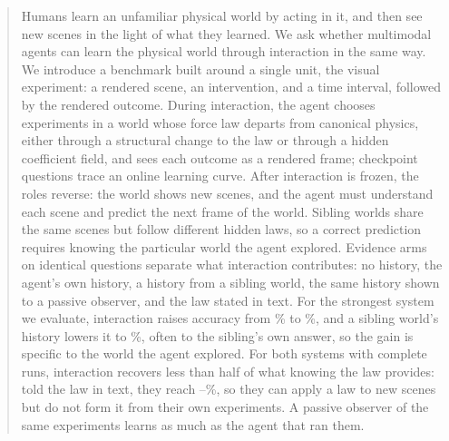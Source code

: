 \begin{abstract}
Humans learn an unfamiliar physical world by acting in it, and then see new scenes in the light of what they learned. We ask whether multimodal agents can learn the physical world through interaction in the same way. We introduce a benchmark built around a single unit, the visual experiment: a rendered scene, an intervention, and a time interval, followed by the rendered outcome. During interaction, the agent chooses experiments in a world whose force law departs from canonical physics, either through a structural change to the law or through a hidden coefficient field, and sees each outcome as a rendered frame; checkpoint questions trace an online learning curve. After interaction is frozen, the roles reverse: the world shows new scenes, and the agent must understand each scene and predict the next frame of the world. Sibling worlds share the same scenes but follow different hidden laws, so a correct prediction requires knowing the particular world the agent explored. Evidence arms on identical questions separate what interaction contributes: no history, the agent's own history, a history from a sibling world, the same history shown to a passive observer, and the law stated in text. For the strongest system we evaluate, interaction raises accuracy from \% to \%, and a sibling world's history lowers it to \%, often to the sibling's own answer, so the gain is specific to the world the agent explored. For both systems with complete runs, interaction recovers less than half of what knowing the law provides: told the law in text, they reach --\%, so they can apply a law to new scenes but do not form it from their own experiments. A passive observer of the same experiments learns as much as the agent that ran them.
\end{abstract}
